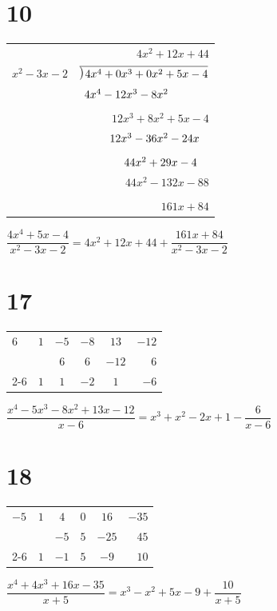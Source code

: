 \documentclass{article}
\newcommand\Mydiv[1]{%
\smash{\raise.3ex\hbox{$\big)$}}\mkern-8mu
        \overline{\enspace\strut#1}}
\theoremstyle{definition}
\begin{document}
\section*{10}
\FloatBarrier
	\begin{center}
		\begin{tabular}{lr}
			& $4x^2+12x+44$ \\
			$x^2-3x-2$ & $\Mydiv{4x^4+0x^3+0x^2+5x-4}$ \\[4pt]
			& $4x^4-12x^3-8x^2\hphantom{+5x-4}$ \\[-8pt]
			& \hrulefill\hphantom{+5x-4}\\[4pt]
			& $12x^3+8x^2+5x-4$ \\[4pt]
			& $12x^3-36x^2-24x\hphantom{.4}$ \\[-8pt]
			& \hphantom{$4x^4-$}\hrulefill\hphantom{.4} \\[4pt]
			& $44x^2+29x-4\hphantom{44}$ \\[4pt]
			& $44x^2-132x-88$ \\[-8pt]
			& \hphantom{$4x^4-12$}\hrulefill\\[4pt]
			& $161x+84$
		\end{tabular}
	\end{center}
\FloatBarrier
$\dfrac{4x^4+5x-4}{x^2-3x-2}=4x^2+12x+44+\dfrac{161x+84}{x^2-3x-2}$

\newpage
\section*{17}
\setlength{\tabcolsep}{10pt}
\FloatBarrier
	\begin{center}
		\begin{tabular}{l|ccccr}
			$6$ & $1$ & $-5$ & $-8$ & $13$ & $-12$ \\
			& & $6$ & $6$ & $-12$ & $6$ \\[-4.75pt]
			\cmidrule{2-6}
			& $1$ & $1$ & $-2$ & $1$ & $-6$
		\end{tabular}
	\end{center}
\FloatBarrier
$\dfrac{x^4-5x^3-8x^2+13x-12}{x-6}=x^3+x^2-2x+1-\dfrac{6}{x-6}$

\section*{18}
\FloatBarrier
	\begin{center}
		\begin{tabular}{l|ccccr}
			$-5$ & $1$ & $4$ & $0$ & $16$ & $-35$ \\
			& & $-5$ & $5$ & $-25$ & $45$ \\[-4.75pt]
			\cmidrule{2-6}
			& $1$ & $-1$ & $5$ & $-9$ & $10$
		\end{tabular}
	\end{center}
\FloatBarrier
$\dfrac{x^4+4x^3+16x-35}{x+5}=x^3-x^2+5x-9+\dfrac{10}{x+5}$
\end{document}
